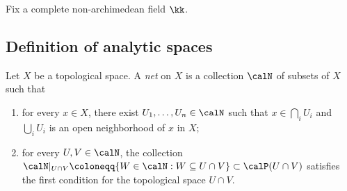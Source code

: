 
    Fix a complete non-archimedean field \(\kk\).

\subsection{Definition of analytic spaces}


    \begin{definition}\label{def:net_and_quasi_net_to_define_analytic_space}
        Let \(X\) be a topological space. 
        A \emph{net} on \(X\) is a collection \(\calN\) of subsets of \(X\) such that
        \begin{enumerate}
            \item for every \(x \in X\), there exist \(U_1, \ldots, U_n \in \calN\) such that \(x \in \bigcap_i U_i\) and \(\bigcup_i U_i\) is an open neighborhood of \(x\) in \(X\);
            \item for every \(U, V \in \calN\), the collection \(\calN|_{U \cap V} \coloneqq \{W \in \calN : W \subseteq U \cap V\} \subset \calP(U \cap V)\) satisfies the first condition for the topological space \(U \cap V\).
        \end{enumerate}
    \end{definition}




